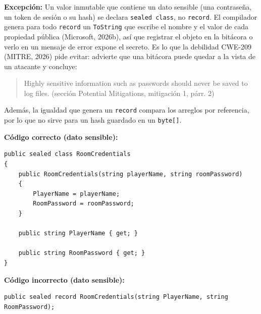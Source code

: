 \textbf{Excepción:} Un valor inmutable que contiene un dato sensible (una contraseña, un token de sesión o su hash) se declara \texttt{sealed class}, no \texttt{record}. El compilador genera para todo \texttt{record} un \texttt{ToString} que escribe el nombre y el valor de cada propiedad pública (Microsoft, 2026b), así que registrar el objeto en la bitácora o verlo en un mensaje de error expone el secreto. Es lo que la debilidad CWE-209 (MITRE, 2026) pide evitar: advierte que una bitácora puede quedar a la vista de un atacante y concluye:
\begin{quote}
Highly sensitive information such as passwords should never be saved to log files. (sección Potential Mitigations, mitigación 1, párr. 2)
\end{quote}
\noindent Además, la igualdad que genera un \texttt{record} compara los arreglos por referencia, por lo que no sirve para un hash guardado en un \texttt{byte[]}.

\textbf{Código correcto (dato sensible):}
\begin{lstlisting}[style=csharpstyle]
public sealed class RoomCredentials
{
    public RoomCredentials(string playerName, string roomPassword)
    {
        PlayerName = playerName;
        RoomPassword = roomPassword;
    }

    public string PlayerName { get; }

    public string RoomPassword { get; }
}
\end{lstlisting}

\textbf{Código incorrecto (dato sensible):}
\begin{lstlisting}[style=csharpstyle]
public sealed record RoomCredentials(string PlayerName, string RoomPassword);
\end{lstlisting}
